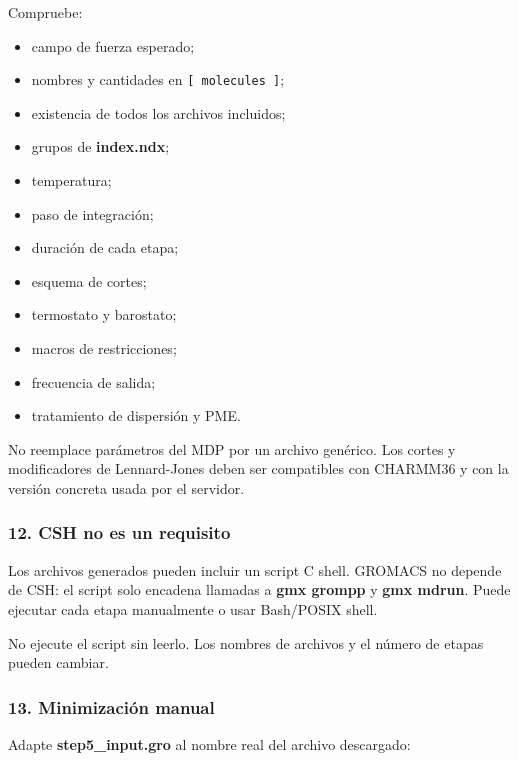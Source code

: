 \documentclass[
  spanish,
  11pt,
  a4paper]{article}
\providecommand{\tightlist}{%
  \setlength{\itemsep}{0pt}\setlength{\parskip}{0pt}}
\begin{document}
Compruebe:

\begin{itemize}
\tightlist
\item
  campo de fuerza esperado;
\item
  nombres y cantidades en \texttt{{[}\ molecules\ {]}};
\item
  existencia de todos los archivos incluidos;
\item
  grupos de \textbf{index.ndx};
\item
  temperatura;
\item
  paso de integración;
\item
  duración de cada etapa;
\item
  esquema de cortes;
\item
  termostato y barostato;
\item
  macros de restricciones;
\item
  frecuencia de salida;
\item
  tratamiento de dispersión y PME.
\end{itemize}

No reemplace parámetros del MDP por un archivo genérico. Los cortes y
modificadores de Lennard-Jones deben ser compatibles con CHARMM36 y con
la versión concreta usada por el servidor.

\subsubsection{12. CSH no es un requisito}\label{csh-no-es-un-requisito}

Los archivos generados pueden incluir un script C shell. GROMACS no
depende de CSH: el script solo encadena llamadas a \textbf{gmx grompp} y
\textbf{gmx mdrun}. Puede ejecutar cada etapa manualmente o usar
Bash/POSIX shell.

No ejecute el script sin leerlo. Los nombres de archivos y el número de
etapas pueden cambiar.

\subsubsection{13. Minimización manual}\label{minimizaciuxf3n-manual}

Adapte \textbf{step5\_input.gro} al nombre real del archivo descargado:
\end{document}
